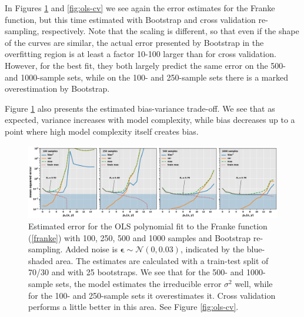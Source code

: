 \documentclass[]{article}
\begin{document}
In Figures \ref{fig:ols-bootstrap} and \ref{fig:ols-cv} we see again the error estimates for the Franke function, but this time estimated with Bootstrap and cross validation re-sampling, respectively. Note that the scaling is different, so that even if the shape of the curves are similar, the actual error presented by Bootstrap in the overfitting region is at least a factor 10-100 larger than for cross validation. However, for the best fit, they both largely predict the same error on the 500- and 1000-sample sets, while on the 100- and 250-sample sets there is a marked overestimation by Bootstrap.

Figure \ref{fig:ols-bootstrap} also presents the estimated bias-variance trade-off. We see that as expected, variance increases with model complexity, while bias decreases up to a point where high model complexity itself creates bias.


\begin{figure}[!htb]
	\centering
	\includegraphics[width=1\linewidth]{./results/ols-bootstrap.png}
	\caption{Estimated error for the OLS polynomial fit to the Franke function (\ref{franke}) with 100, 250, 500 and 1000 samples and Bootstrap re-sampling. Added noise is $\mathbf{\epsilon} \sim \mathcal{N}(0, 0.03)$, indicated by the blue-shaded area. The estimates are calculated with a train-test split of 70/30 and with 25 bootstraps. We see that for the 500- and 1000-sample sets, the model estimates the irreducible error $\sigma^2$ well, while for the 100- and 250-sample sets it overestimates it. Cross validation performs a little better in this area. See Figure \ref{fig:ols-cv}.}
	\label{fig:ols-bootstrap}
\end{figure}
\end{document}
